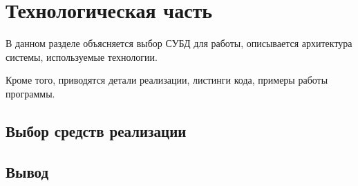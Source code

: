 \chapter{Технологическая часть}
В данном разделе объясняется выбор СУБД для работы, описывается архитектура системы, используемые технологии.

Кроме того, приводятся детали реализации, листинги кода, примеры работы программы.  
\section{Выбор средств реализации}


\section{Вывод}

